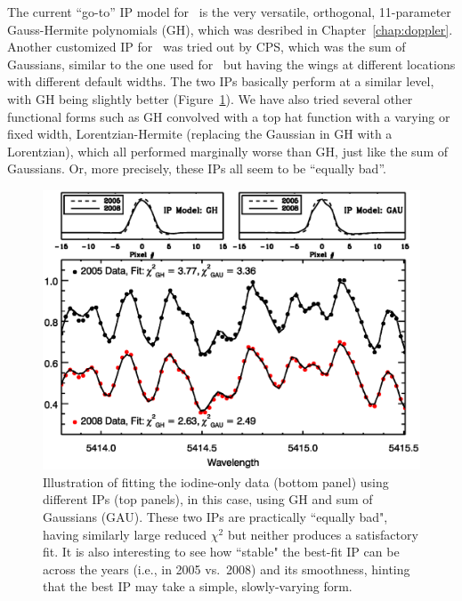The current ``go-to'' IP model for \hrs\ is the very versatile,
orthogonal, 11-parameter Gauss-Hermite polynomials (GH), which was
desribed in Chapter~\ref{chap:doppler}. Another customized IP for
\het\ was tried out by CPS, which was the sum of Gaussians, similar to
the one used for \keck\ but having the wings at different locations
with different default widths. The two IPs basically perform at a
similar level, with GH being slightly better
(Figure~\ref{het:fig:ghgau}). We have also tried several other
functional forms such as GH convolved with a top hat function with a
varying or fixed width, Lorentzian-Hermite (replacing the Gaussian in
GH with a Lorentzian), which all performed marginally worse than GH,
just like the sum of Gaussians. Or, more precisely, these IPs all seem
to be ``equally bad''.


\begin{figure}
\centering
\includegraphics[scale=0.45]{het/iodfit.eps}
\caption{Illustration of fitting the iodine-only data (bottom panel)
  using different IPs (top panels), in this case, using GH and sum of
  Gaussians (GAU). These two IPs are practically ``equally bad",
  having similarly large reduced $\chi^2$ but neither produces a
  satisfactory fit. It is also interesting to see how ``stable" the
  best-fit IP can be across the years (i.e., in 2005 vs.~2008) and its
  smoothness, hinting that the best IP may take a simple, slowly-varying form. 
\label{het:fig:ghgau}}
\end{figure}


